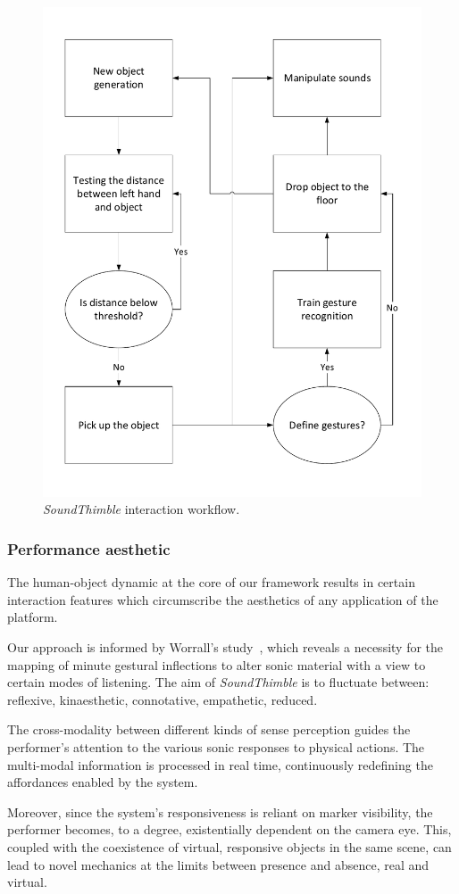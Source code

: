 \documentclass{nime-alternate}
\begin{document}
\begin{figure}[t]
	\centering
	\includegraphics[width=.65\columnwidth, clip, trim={0 .55cm 0 0}]{img/concept}
	\caption{\textit{SoundThimble} interaction workflow.}
	\label{fig:concept}
\end{figure}

\subsubsection{Performance aesthetic}
\label{sec:aesthetic}

The human-object dynamic at the core of our framework results in certain interaction features which circumscribe the aesthetics of any application of the platform.

Our approach is informed by Worrall's study~\cite{worrall2013understanding}, which reveals a necessity for the mapping of minute gestural inflections to alter sonic material with a view to certain modes of listening. The aim of \textit{SoundThimble} is to fluctuate between: reflexive, kinaesthetic, connotative, empathetic, reduced.

The cross-modality between different kinds of sense perception guides the performer's attention to the various sonic responses to physical actions. The multi-modal information is processed in real time, continuously redefining the affordances enabled by the system.

Moreover, since the system's responsiveness is reliant on marker visibility, the performer becomes, to a degree, existentially dependent on the camera eye. This, coupled with the coexistence of virtual, responsive objects in the same scene, can lead to novel mechanics at the limits between presence and absence, real and virtual.
\end{document}

